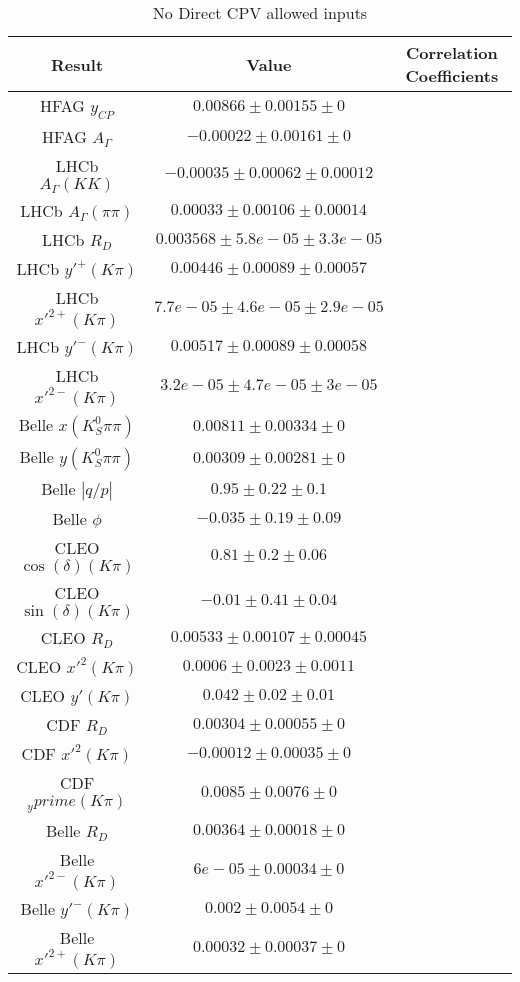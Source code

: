 \begin{table}[htdp]
\caption{No Direct CPV allowed inputs}
\begin{center}
\begin{tabular}{|c|c|c|}
\hline
Result & Value & Correlation Coefficients \\
\hline \hline
HFAG $ y_{CP}$ & $0.00866\pm0.00155\pm0$ & \\
HFAG $ A_\Gamma$ & $-0.00022\pm0.00161\pm0$ & \\
LHCb $ A_\Gamma(KK)$ & $-0.00035\pm0.00062\pm0.00012$ & \\
LHCb $ A_\Gamma(\pi\pi)$ & $0.00033\pm0.00106\pm0.00014$ & \\
LHCb $ R_D$ & $0.003568\pm5.8e-05\pm3.3e-05$ & \\
LHCb $y'^+(K\pi)$ & $0.00446\pm0.00089\pm0.00057$ & \\
LHCb $ x'^{2+}(K\pi)$ & $7.7e-05\pm4.6e-05\pm2.9e-05$ & \\
LHCb $y'^-(K\pi)$ & $0.00517\pm0.00089\pm0.00058$ & \\
LHCb $ x'^{2-}(K\pi)$ & $3.2e-05\pm4.7e-05\pm3e-05$ & \\
Belle $x(K_S^0\pi\pi)$ & $0.00811\pm0.00334\pm0$ & \\
Belle $y(K_S^0\pi\pi)$ & $0.00309\pm0.00281\pm0$ & \\
Belle $|q/p|$ & $0.95\pm0.22\pm0.1$ & \\
Belle $\phi$ & $-0.035\pm0.19\pm0.09$ & \\
CLEO $\cos(\delta)(K\pi)$ & $0.81\pm0.2\pm0.06$ & \\
CLEO $\sin(\delta)(K\pi)$ & $-0.01\pm0.41\pm0.04$ & \\
CLEO $ R_D$ & $0.00533\pm0.00107\pm0.00045$ & \\
CLEO $ x'^2(K\pi)$ & $0.0006\pm0.0023\pm0.0011$ & \\
CLEO $y'(K\pi)$ & $0.042\pm0.02\pm0.01$ & \\
CDF $ R_D$ & $0.00304\pm0.00055\pm0$ & \\
CDF $ x'^2(K\pi)$ & $-0.00012\pm0.00035\pm0$ & \\
CDF $_yprime(K\pi)$ & $0.0085\pm0.0076\pm0$ & \\
Belle $ R_D$ & $0.00364\pm0.00018\pm0$ & \\
Belle $ x'^{2-}(K\pi)$ & $6e-05\pm0.00034\pm0$ & \\
Belle $y'^-(K\pi)$ & $0.002\pm0.0054\pm0$ & \\
Belle $ x'^{2+}(K\pi)$ & $0.00032\pm0.00037\pm0$ & \\

\end{tabular}
\end{center}
\end{table}
